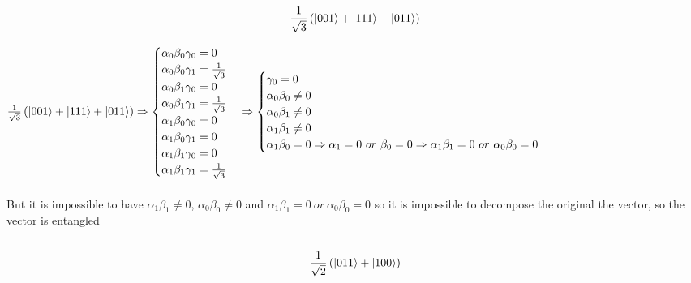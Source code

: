 \documentclass{article}
\DeclarePairedDelimiter\ket{\lvert}{\rangle}
\begin{document}
\[
\frac{1}{\sqrt{3}} \left(\ket{001} + \ket{111} + \ket{011} \right)
\]

\(
\frac{1}{\sqrt{3}} \left(\ket{001} + \ket{111} + \ket{011} \right) \Rightarrow \begin{cases} 
\alpha_{0} \beta_{0} \gamma_{0} = 0 \\
\alpha_{0} \beta_{0} \gamma_{1} = \frac{1}{\sqrt{3}} \\
\alpha_{0} \beta_{1} \gamma_{0} = 0 \\
\alpha_{0} \beta_{1} \gamma_{1} = \frac{1}{\sqrt{3}} \\
\alpha_{1} \beta_{0} \gamma_{0} = 0 \\
\alpha_{1} \beta_{0} \gamma_{1} = 0 \\
\alpha_{1} \beta_{1} \gamma_{0} = 0 \\
\alpha_{1} \beta_{1} \gamma_{1} = \frac{1}{\sqrt{3}} 
\end{cases}
\Rightarrow
\begin{cases} 
 \gamma_{0} = 0 \\
 \alpha_{0} \beta_{0} \neq 0 \\ 
 \alpha_{0} \beta_{1} \neq 0 \\ 
 \alpha_{1} \beta_{1} \neq 0 \\ 
 \alpha_{1} \beta_{0} = 0 \Rightarrow \alpha_{1} = 0 ~or~ \beta_{0} = 0 \Rightarrow \alpha_{1} \beta_{1} = 0 ~or~ \alpha_{0} \beta_{0} = 0
\end{cases}
\) 
\\
\\
But it is impossible to have \( \alpha_{1} \beta_{1} \neq 0\), \(\alpha_{0} \beta_{0} \neq 0 \) and \(\alpha_{1} \beta_{1} = 0 ~or~ \alpha_{0} \beta_{0} = 0\) so it is impossible to decompose the original the vector, so the vector is entangled
\\
\\
\[
\frac{1}{\sqrt{2}} \left(\ket{011} + \ket{100}\right)
\] 
\end{document}
